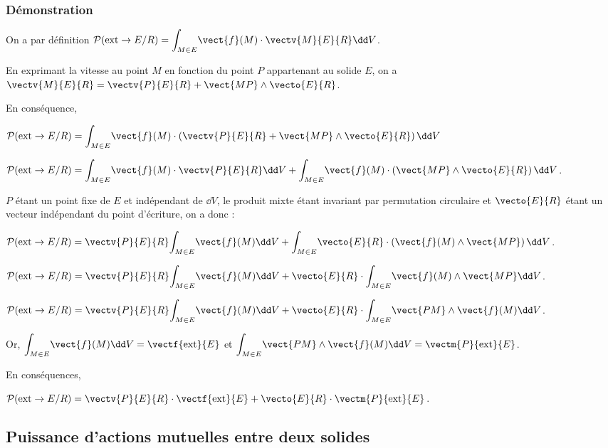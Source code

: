 \subsubsection*{Démonstration}
On a par définition
$ \mathcal{P}(\text{ext} \rightarrow E/R)=\displaystyle{\int_{M\in E}}\vect{f}(M)\cdot \vectv{M}{E}{R} \dd V $.

En exprimant la vitesse au point $M$ en fonction du point $P$ appartenant au solide $E$, on a 
$ \vectv{M}{E}{R} = \vectv{P}{E}{R}  + \vect{MP}\wedge \vecto{E}{R}$.


En conséquence, 

$ \mathcal{P}(\text{ext} \rightarrow E/R)=\displaystyle{\int_{M\in E}}\vect{f}(M)\cdot \left( \vectv{P}{E}{R}  + \vect{MP}\wedge \vecto{E}{R} \right) \dd V $

$ \mathcal{P}(\text{ext} \rightarrow E/R)=\displaystyle{\int_{M\in E}}\vect{f}(M)\cdot  \vectv{P}{E}{R}   \dd V
+\displaystyle{\int_{M\in E}}\vect{f}(M)\cdot \left(  \vect{MP}\wedge \vecto{E}{R} \right) \dd V $.

$P$ étant un point fixe de $E$ et indépendant de $\dd V$, le produit mixte étant invariant par permutation circulaire et $ \vecto{E}{R}$ étant un vecteur indépendant du point d'écriture, on a donc :

$ \mathcal{P}(\text{ext} \rightarrow E/R)
=  \vectv{P}{E}{R} \displaystyle{\int_{M\in E}}\vect{f}(M)  \dd V
+\displaystyle{\int_{M\in E}}\vecto{E}{R}\cdot \left( \vect{f}(M)\wedge  \vect{MP} \right) \dd V $.

$ \mathcal{P}(\text{ext} \rightarrow E/R)
=  \vectv{P}{E}{R} \displaystyle{\int_{M\in E}}\vect{f}(M)  \dd V
+\vecto{E}{R}\cdot \displaystyle{\int_{M\in E}}  \vect{f}(M)\wedge  \vect{MP}  \dd V $.

$ \mathcal{P}(\text{ext} \rightarrow E/R)
=  \vectv{P}{E}{R} \displaystyle{\int_{M\in E}}\vect{f}(M)  \dd V
+\vecto{E}{R}\cdot \displaystyle{\int_{M\in E}}  \vect{PM}\wedge \vect{f}(M)   \dd V $.


Or, $\displaystyle{\int_{M\in E}}\vect{f}(M)  \dd V = \vectf{\text{ext}}{E}$ et 
$ \displaystyle{\int_{M\in E}}  \vect{PM}\wedge \vect{f}(M)   \dd V = \vectm{P}{\text{ext}}{E}$.

En conséquences, 

$ \mathcal{P}(\text{ext} \rightarrow E/R)
=  \vectv{P}{E}{R}\cdot \vectf{\text{ext}}{E} +\vecto{E}{R}\cdot  \vectm{P}{\text{ext}}{E} $.


\subsection{Puissance d'actions mutuelles entre deux solides}



